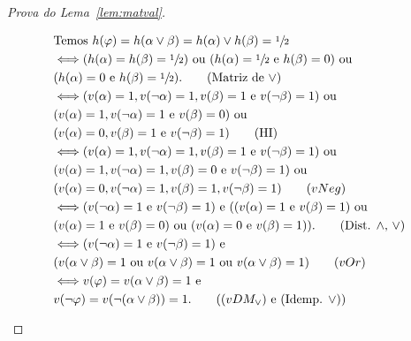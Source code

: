 \begin{proof}[Prova do Lema~\ref{lem:matval}]
\begin{provaporcasos}
\begin{provaporsubcasos}
                \begin{align*}
                    &\textnormal{Temos }h(\phi) = h(\alpha \lor \beta) = h(\alpha) \lor h(\beta) = \meio{}\\
                    &\Longleftrightarrow (h(\alpha) = h(\beta) = \meio{})\textnormal{ ou } (h(\alpha) = \meio{}\textnormal{ e }h(\beta) = 0)\textnormal{ ou }\\&(h(\alpha) = 0\textnormal{ e }h(\beta) = \meio{}).\tag*{(Matriz de $\lor$)}\\
                    &\Longleftrightarrow (v(\alpha) = 1, v(\neg \alpha) = 1, v(\beta) = 1\textnormal{ e }v(\neg \beta) = 1)\text{ ou }\\&(v(\alpha) = 1, v(\neg \alpha) = 1\textnormal{ e }v(\beta) = 0)\text{ ou }\\&(v(\alpha) = 0, v(\beta) = 1\textnormal{ e }v(\neg \beta) = 1)\tag*{(HI)}\\
                    &\Longleftrightarrow (v(\alpha) = 1, v(\neg \alpha) = 1, v(\beta) = 1\textnormal{ e }v(\neg \beta) = 1)\textnormal{ ou }\\&(v(\alpha) = 1, v(\neg \alpha) = 1, v(\beta) = 0\textnormal{ e }v(\neg \beta) = 1)\textnormal{ ou }\\&(v(\alpha) = 0, v(\neg \alpha) = 1, v(\beta) = 1, v(\neg \beta) = 1)\tag*{$(vNeg)$}\\
                    &\Longleftrightarrow (v(\neg \alpha) = 1\textnormal{ e }v(\neg \beta) = 1)\textnormal{ e }((v(\alpha) = 1\textnormal{ e }v(\beta) = 1)\text{ ou }\\&(v(\alpha) = 1\textnormal{ e }v(\beta) = 0)\text{ ou }(v(\alpha) = 0\textnormal{ e }v(\beta) = 1)).\tag*{(Dist. $\land$, $\lor$)}\\
                    &\Longleftrightarrow (v(\neg \alpha) = 1\textnormal{ e }v(\neg \beta) = 1)\textnormal{ e }\\&(v(\alpha \lor \beta) = 1\textnormal{ ou }v(\alpha \lor \beta) = 1\textnormal{ ou }v(\alpha \lor \beta) = 1)\tag*{$(vOr)$}\\
                    &\Longleftrightarrow v(\phi) = v(\alpha \lor \beta) = 1\textnormal{ e }\\&v(\neg \phi) = v(\neg(\alpha \lor \beta)) = 1.\tag*{($(vDM_{\lor})$ e (Idemp. $\lor$))}
                \end{align*}
                    

\end{provaporsubcasos}
\end{provaporcasos}
\end{proof}
